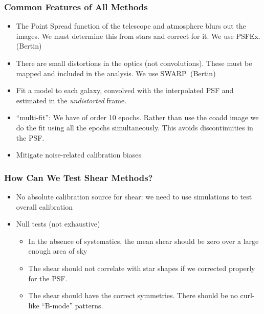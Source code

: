 \documentclass{beamer}
\begin{document}
\frame
{
    \frametitle{Common Features of All Methods}

    \begin{itemize}
        
        \item The Point Spread function of the telescope and atmosphere blurs
            out the images.  We must determine this from stars and correct for it.
            We use PSFEx. (Bertin)
        
        \item There are small distortions in the optics (not convolutions).
            These must be mapped and included in the analysis.
            We use SWARP. (Bertin)

        \item Fit a model to each galaxy, convolved with the interpolated PSF
            and estimated in the {\it undistorted} frame.

        \item ``multi-fit'': We have of order 10 epochs.  Rather than use the coadd image
            we do the fit using all the epochs simultaneously.  This avoids
            discontinuities in the PSF.

        \item Mitigate noise-related calibration biases

    \end{itemize}
}

\frame
{
    \frametitle{How Can We Test Shear Methods?}

    \begin{itemize}

        \item No absolute calibration source for shear: we need to use
            simulations to test overall calibration

        \item Null tests (not exhaustive)

            \begin{itemize}

                \item In the absence of systematics, the mean shear should be
                    zero over a large enough area of sky

                \item The shear should not correlate with star shapes if we
                    corrected properly for the PSF.

                \item The shear should have the correct symmetries.  There
                    should be no curl-like ``B-mode'' patterns.

            \end{itemize}

    \end{itemize}
}
\end{document}
